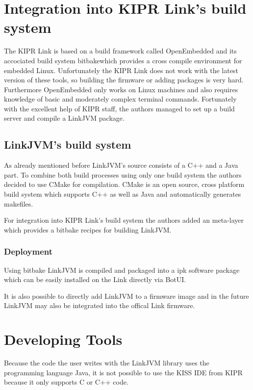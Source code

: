 \documentclass{juniorjournal}
\begin{document}
\section{Integration into KIPR Link's build system}
The KIPR\cite{KIPR} Link\cite{link} is based on a build framework called \frqq OpenEmbedded\flqq\cite{openembedded} and its accociated build system \frqq bitbake\flqq  which provides a cross compile environment for embedded Linux\cite{Look_Inside_Kipr_Link}.
Unfortunately the KIPR\cite{KIPR} Link\cite{link} does not work with the latest version of these tools, so building the firmware or adding packages is very hard.
Furthermore OpenEmbedded\cite{openembedded} only works on Linux machines and also requires knowledge of basic and moderately complex terminal commands.
Fortunately with the excellent help of KIPR staff, the authors managed to set up a build server and compile a LinkJVM package.

\subsection{LinkJVM's build system}
As already mentioned before LinkJVM's source consists of a C++ and a Java part.
To combine both build processes using only one build system the authors decided to use CMake for compilation.
CMake is an open source, cross platform build system which supports C++ as well as Java and automatically generates makefiles.

For integration into KIPR\cite{KIPR} Link's\cite{link} build system the authors added an meta-layer which provides a bitbake recipes for building LinkJVM.

\subsubsection{Deployment}
Using bitbake LinkJVM is compiled and packaged into a ipk software package which can be easily installed on the Link\cite{link} directly via BotUI.

It is also possible to directly add LinkJVM to a firmware image and in the future LinkJVM may also be integrated into the offical Link\cite{link} firmware.
\section{Developing Tools}
\label{sec:developing-tools}
Because the code the user writes with the LinkJVM library uses the programming 
language Java\cite{Java}, it is not possible to use the KISS IDE from KIPR\cite{KIPR} because it only 
supports C or C++ code.
\end{document}
